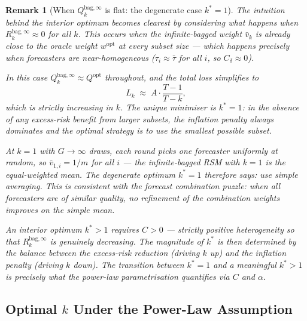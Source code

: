 \documentclass[12pt,a4paper]{article}
\newtheorem{remark}{Remark}
\theoremstyle{definition}
\newcommand{\wopt}{w^{\mathrm{opt}}}
\newcommand{\Qopt}{Q^{\mathrm{opt}}}
\newcommand{\Qbag}{Q_k^{\mathrm{bag},\infty}}
\newcommand{\Rk}{R_k^{\mathrm{bag},\infty}}
\begin{document}
\begin{remark}[When $Q_k^{\mathrm{bag},\infty}$ is flat: the degenerate case
$k^*=1$]\label{rem:flat}
The intuition behind the interior optimum becomes clearest by considering
what happens when $\Rk\approx 0$ for \emph{all} $k$.  This occurs when
the infinite-bagged weight $\bar v_k$ is already close to the oracle weight
$\wopt$ at every subset size --- which happens precisely when forecasters
are near-homogeneous ($\tau_i\approx\bar\tau$ for all $i$, so $C_\delta\approx 0$).

In this case $\Qbag\approx\Qopt$ throughout, and the total loss simplifies to
\begin{equation}\label{eq:flatcase}
  L_k \;\approx\; A\cdot\frac{T-1}{T-k},
\end{equation}
which is strictly \emph{increasing} in $k$.  The unique minimiser is
$k^*=1$: in the absence of any excess-risk benefit from larger subsets,
the inflation penalty always dominates and the optimal strategy is to use
the smallest possible subset.

At $k=1$ with $G\to\infty$ draws, each round picks one forecaster uniformly
at random, so $\bar v_{1,i}=1/m$ for all $i$ --- the infinite-bagged RSM
with $k=1$ \emph{is} the equal-weighted mean.  The degenerate optimum
$k^*=1$ therefore says: use simple averaging.  This is consistent with the
forecast combination puzzle: when all forecasters are of similar quality,
no refinement of the combination weights improves on the simple mean.

An interior optimum $k^*>1$ requires $C>0$ --- strictly positive
heterogeneity so that $\Rk$ is genuinely decreasing.  The magnitude of
$k^*$ is then determined by the balance between the excess-risk reduction
(driving $k$ up) and the inflation penalty (driving $k$ down).  The
transition between $k^*=1$ and a meaningful $k^*>1$ is precisely what the
power-law parametrisation quantifies via $C$ and $\alpha$.
\end{remark}

\subsection{Optimal $k$ Under the Power-Law Assumption}
\label{sec:kstar_powerlaw}
\end{document}
